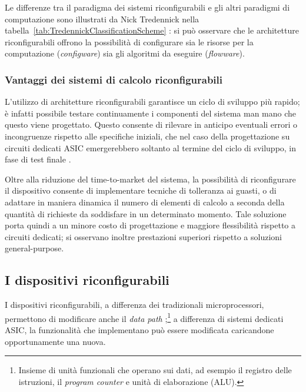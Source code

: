 Le differenze tra il paradigma dei sistemi riconfigurabili e gli altri paradigmi di
computazione sono illustrati da Nick Tredennick nella
tabella~\ref{tab:TredennickClassificationScheme} \cite{TredennickClassification}: si può
osservare che le architetture riconfigurabili offrono la possibilità di configurare sia le
risorse per la computazione (\emph{configware}) sia gli algoritmi da eseguire
(\emph{flowware}). 

\subsubsection{Vantaggi dei sistemi di calcolo riconfigurabili}
L'utilizzo di architetture riconfigurabili garantisce un ciclo di sviluppo pi\`u rapido;
\`e infatti possibile testare continuamente i componenti del sistema man mano che questo viene
progettato. Questo consente di rilevare in anticipo eventuali errori o incongruenze rispetto alle
specifiche iniziali, che nel caso della progettazione su circuiti dedicati \ac{ASIC} emergerebbero
soltanto al termine del ciclo di sviluppo, in fase di test finale \cite{ReconfigurableSystemDesignVerification}.

Oltre alla riduzione del time-to-market del sistema, la possibilit\`a di riconfigurare
il dispositivo consente di implementare tecniche di tolleranza ai guasti, o di adattare
in maniera dinamica il numero di elementi di calcolo a seconda della quantit\`a di richieste
da soddisfare in un determinato momento. Tale soluzione porta quindi a un minore costo di progettazione
e maggiore flessibilità rispetto a circuiti dedicati; si osservano inoltre prestazioni superiori
rispetto a soluzioni general-purpose.



\subsection{I dispositivi riconfigurabili}
I dispositivi riconfigurabili, a differenza dei tradizionali microprocessori, permettono di modificare
anche il \emph{data path} \cite{ReconfigurableDatapath};\footnote{Insieme di unit\`a funzionali che operano sui dati, ad esempio il
registro delle istruzioni, il \emph{program counter} e unit\`a di elaborazione (\acs{ALU}).}
a differenza di sistemi dedicati \ac{ASIC}, la funzionalit\`a che implementano pu\`o essere
modificata caricandone opportunamente una nuova.


